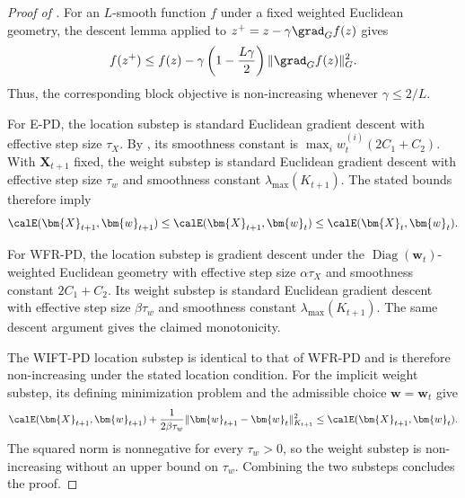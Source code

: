 \begin{proof}[Proof of ]
For an $L$-smooth function $f$ under a fixed weighted Euclidean geometry, the descent lemma applied to $z^+=z-\gamma\grad_G f(z)$ gives
\begin{align*}
f(z^+)\leq f(z)-\gamma\left(1-\frac{L\gamma}{2}\right)\|\grad_G f(z)\|_G^2.
\end{align*}
Thus, the corresponding block objective is non-increasing whenever $\gamma\leq2/L$.

For E-PD, the location substep is standard Euclidean gradient descent with effective step size $\tau_X$. By , its smoothness constant is $\max_i w_t^{(i)}(2C_1+C_2)$. With $\bm{X}_{t+1}$ fixed, the weight substep is standard Euclidean gradient descent with effective step size $\tau_w$ and smoothness constant $\lambda_{\max}(K_{t+1})$. The stated bounds therefore imply
\begin{align*}
\calE(\bm{X}_{t+1},\bm{w}_{t+1})\leq\calE(\bm{X}_{t+1},\bm{w}_t)\leq\calE(\bm{X}_t,\bm{w}_t).
\end{align*}

For WFR-PD, the location substep is gradient descent under the $\operatorname{Diag}(\bm{w}_t)$-weighted Euclidean geometry with effective step size $\alpha\tau_X$ and smoothness constant $2C_1+C_2$. Its weight substep is standard Euclidean gradient descent with effective step size $\beta\tau_w$ and smoothness constant $\lambda_{\max}(K_{t+1})$. The same descent argument gives the claimed monotonicity.

The WIFT-PD location substep is identical to that of WFR-PD and is therefore non-increasing under the stated location condition. For the implicit weight substep, its defining minimization problem and the admissible choice $\bm{w}=\bm{w}_t$ give
\begin{align*}
\calE(\bm{X}_{t+1},\bm{w}_{t+1})
+\frac{1}{2\beta\tau_w}\|\bm{w}_{t+1}-\bm{w}_t\|_{K_{t+1}}^2
\leq\calE(\bm{X}_{t+1},\bm{w}_t).
\end{align*}
The squared norm is nonnegative for every $\tau_w>0$, so the weight substep is non-increasing without an upper bound on $\tau_w$. Combining the two substeps concludes the proof.
\end{proof}

